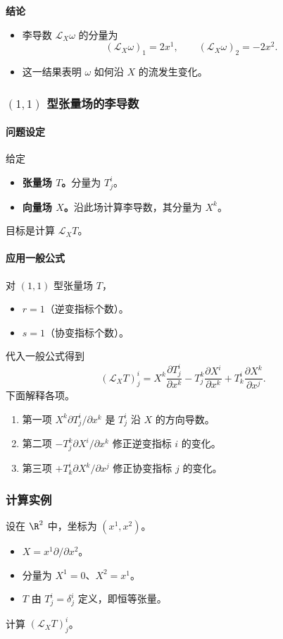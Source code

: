 \textbf{结论}
\begin{itemize}
  \item 李导数 $\mathcal L_X\omega$ 的分量为
  \[
    (\mathcal L_X\omega)_1=2x^1,\qquad(\mathcal L_X\omega)_2=-2x^2.
  \]
  \item 这一结果表明 $\omega$ 如何沿 $X$ 的流发生变化。
\end{itemize}

\subsubsection{$(1,1)$ 型张量场的李导数}
\paragraph{问题设定}
给定
\begin{itemize}
  \item \textbf{张量场 $T$。}分量为 $T^i_j$。
  \item \textbf{向量场 $X$。}沿此场计算李导数，其分量为 $X^k$。
\end{itemize}
目标是计算 $\mathcal L_X T$。

\paragraph{应用一般公式}
对 $(1,1)$ 型张量场 $T$，
\begin{itemize}
  \item $r=1$（逆变指标个数）。
  \item $s=1$（协变指标个数）。
\end{itemize}
代入一般公式得到
\[
  (\mathcal L_X T)^i_j
      =X^k\frac{\partial T^i_j}{\partial x^k}
       -T^k_j\frac{\partial X^i}{\partial x^k}
       +T^i_k\frac{\partial X^k}{\partial x^j}.
\]
下面解释各项。
\begin{enumerate}
  \item 第一项 $X^k\partial T^i_j/\partial x^k$ 是 $T^i_j$ 沿 $X$ 的方向导数。
  \item 第二项 $-T^k_j\partial X^i/\partial x^k$ 修正逆变指标 $i$ 的变化。
  \item 第三项 $+T^i_k\partial X^k/\partial x^j$ 修正协变指标 $j$ 的变化。
\end{enumerate}

\subsubsection{计算实例}
设在 $\R^2$ 中，坐标为 $(x^1,x^2)$。
\begin{itemize}
  \item $X=x^1\partial/\partial x^2$。
  \item 分量为 $X^1=0$、$X^2=x^1$。
  \item $T$ 由 $T^i_j=\delta^i_j$ 定义，即恒等张量。
\end{itemize}
计算 $(\mathcal L_X T)^i_j$。

